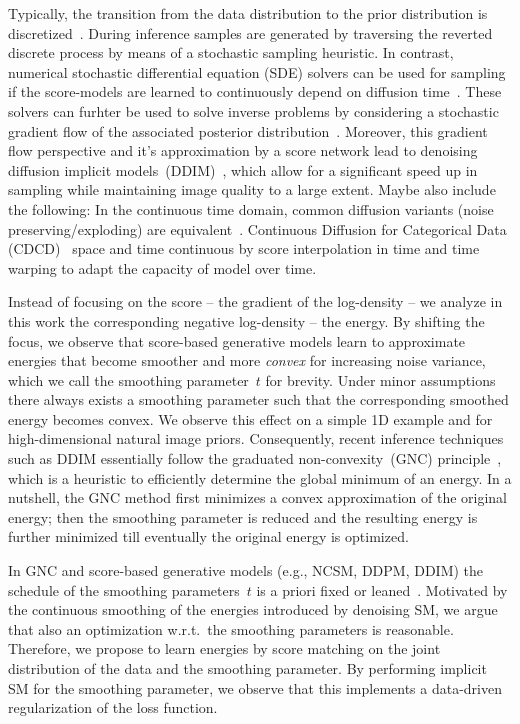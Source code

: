 \documentclass{article}
\theoremstyle{plain}
\theoremstyle{definition}
\theoremstyle{remark}
\begin{document}
Typically, the transition from the data distribution to the prior distribution is discretized~\citep{HoJa20,SoEr19,SoEr20}.
During inference samples are generated by traversing the reverted discrete process by means of a stochastic sampling heuristic.
In contrast, numerical stochastic differential equation (SDE) solvers can be used for sampling if the score-models are learned to continuously depend on diffusion time~\citep{SoSo21}.
These solvers can furhter be used to solve inverse problems by considering a stochastic gradient flow of the associated posterior distribution~\citep[Eq. (14)]{SoSo21}.
Moreover, this gradient flow perspective and it's approximation by a score network lead to denoising diffusion implicit models~(DDIM)~\citep{SoMe22}, which allow for a significant speed up in sampling while maintaining image quality to a large extent.
Maybe also include the following:
In the continuous time domain, common diffusion variants (noise preserving/exploding) are equivalent~\citep{KiSa21}.
Continuous Diffusion for Categorical Data (CDCD)~\cite{DiSa22} space and time continuous by score interpolation in time and time warping to adapt the capacity of model over time.

Instead of focusing on the score -- the gradient of the log-density -- we analyze in this work the corresponding negative log-density -- the energy.
By shifting the focus, we observe that score-based generative models learn to approximate energies that become smoother and more \emph{convex} for increasing noise variance, which we call the smoothing parameter~$t$ for brevity.
Under minor assumptions there always exists a smoothing parameter such that the corresponding smoothed energy becomes convex.
We observe this effect on a simple 1D example and for high-dimensional natural image priors.
Consequently, recent inference techniques such as DDIM essentially follow the graduated non-convexity~(GNC) principle~\citep{BlZi87}, which is a heuristic to efficiently determine the global minimum of an energy.
In a nutshell, the GNC method first minimizes a convex approximation of the original energy; then the smoothing parameter is reduced and the resulting energy is further minimized till eventually the original energy is optimized.

In GNC and score-based generative models (e.g., NCSM, DDPM, DDIM) the schedule of the smoothing parameters~$t$ is a priori fixed or leaned~\citep{KiSa21}.
Motivated by the continuous smoothing of the energies introduced by denoising SM, we argue that also an optimization w.r.t.~the smoothing parameters is reasonable.
Therefore, we propose to learn energies by score matching on the joint distribution of the data and the smoothing parameter.
By performing implicit SM for the smoothing parameter, we observe that this implements a data-driven regularization of the loss function.
\end{document}
